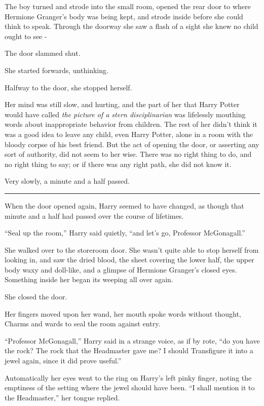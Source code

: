 The boy turned and strode into the small room, opened the rear door to where Hermione Granger's body was being kept, and strode inside before she could think to speak. Through the doorway she saw a flash of a sight she knew no child ought to see -

The door slammed shut.

She started forwards, unthinking.

Halfway to the door, she stopped herself.

Her mind was still slow, and hurting, and the part of her that Harry Potter would have called \emph{the picture of a stern disciplinarian} was lifelessly mouthing words about inappropriate behavior from children. The rest of her didn't think it was a good idea to leave any child, even Harry Potter, alone in a room with the bloody corpse of his best friend. But the act of opening the door, or asserting any sort of authority, did not seem to her wise. There was no right thing to do, and no right thing to say; or if there was any right path, she did not know it.

Very slowly, a minute and a half passed.

\begin{center}\rule{3in}{0.4pt}\end{center}

When the door opened again, Harry seemed to have changed, as though that minute and a half had passed over the course of lifetimes.

``Seal up the room,'' Harry said quietly, ``and let's go, Professor McGonagall.''

She walked over to the storeroom door. She wasn't quite able to stop herself from looking in, and saw the dried blood, the sheet covering the lower half, the upper body waxy and doll-like, and a glimpse of Hermione Granger's closed eyes. Something inside her began its weeping all over again.

She closed the door.

Her fingers moved upon her wand, her mouth spoke words without thought, Charms and wards to seal the room against entry.

``Professor McGonagall,'' Harry said in a strange voice, as if by rote, ``do you have the rock? The rock that the Headmaster gave me? I should Transfigure it into a jewel again, since it did prove useful.''

Automatically her eyes went to the ring on Harry's left pinky finger, noting the emptiness of the setting where the jewel should have been. ``I shall mention it to the Headmaster,'' her tongue replied.

